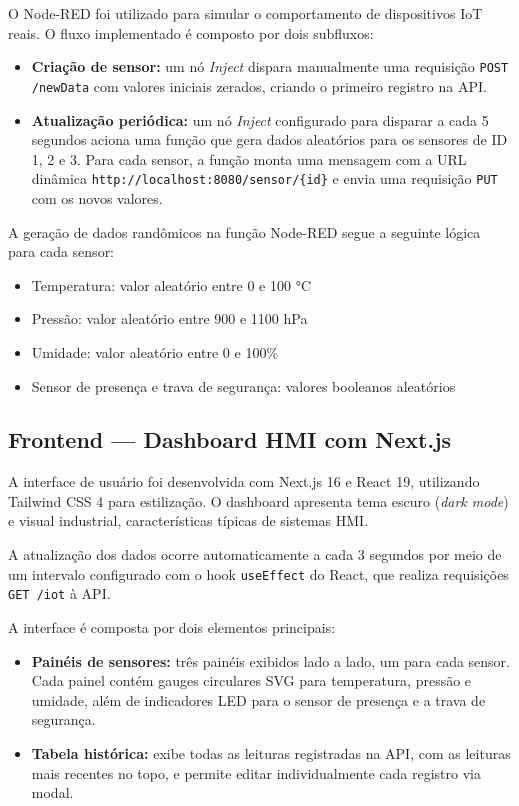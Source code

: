 \documentclass[12pt]{unisenaiclass}
\begin{document}
O Node-RED foi utilizado para simular o comportamento de dispositivos IoT reais. O fluxo implementado é composto por dois subfluxos:

\begin{itemize}
    \item \textbf{Criação de sensor:} um nó \textit{Inject} dispara manualmente uma requisição \texttt{POST /newData} com valores iniciais zerados, criando o primeiro registro na API.
    \item \textbf{Atualização periódica:} um nó \textit{Inject} configurado para disparar a cada 5 segundos aciona uma função que gera dados aleatórios para os sensores de ID 1, 2 e 3. Para cada sensor, a função monta uma mensagem com a URL dinâmica \texttt{http://localhost:8080/sensor/\{id\}} e envia uma requisição \texttt{PUT} com os novos valores.
\end{itemize}

A geração de dados randômicos na função Node-RED segue a seguinte lógica para cada sensor:

\begin{itemize}
    \item Temperatura: valor aleatório entre 0 e 100 °C
    \item Pressão: valor aleatório entre 900 e 1100 hPa
    \item Umidade: valor aleatório entre 0 e 100\%
    \item Sensor de presença e trava de segurança: valores booleanos aleatórios
\end{itemize}

\subsection{Frontend — Dashboard HMI com Next.js}

A interface de usuário foi desenvolvida com Next.js 16 e React 19, utilizando Tailwind CSS 4 para estilização. O dashboard apresenta tema escuro (\textit{dark mode}) e visual industrial, características típicas de sistemas HMI.

A atualização dos dados ocorre automaticamente a cada 3 segundos por meio de um intervalo configurado com o hook \texttt{useEffect} do React, que realiza requisições \texttt{GET /iot} à API.

A interface é composta por dois elementos principais:

\begin{itemize}
    \item \textbf{Painéis de sensores:} três painéis exibidos lado a lado, um para cada sensor. Cada painel contém gauges circulares SVG para temperatura, pressão e umidade, além de indicadores LED para o sensor de presença e a trava de segurança.
    \item \textbf{Tabela histórica:} exibe todas as leituras registradas na API, com as leituras mais recentes no topo, e permite editar individualmente cada registro via modal.
\end{itemize}
\end{document}
